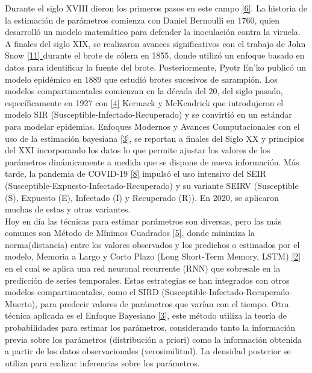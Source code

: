 Durante el siglo XVIII dieron los primeros pasos en este campo \hyperref[sec:6]{[6]}. La historia de la estimación de parámetros comienza con Daniel Bernoulli en 1760, quien desarrolló un modelo matemático para defender la inoculación contra la viruela. A finales del siglo XIX, se realizaron avances significativos con el trabajo de John Snow \hyperref[sec:11]{[11] } durante el brote de cólera en 1855, donde utilizó un enfoque basado en datos para identificar la fuente del brote. Posteriormente, Pyotr En'ko publicó un modelo epidémico en 1889 que estudió brotes sucesivos de sarampión. Los modelos compartimentales comienzan en la década del 20, del siglo pasado, específicamente en 1927 con \hyperref[sec:4]{[4]} Kermack y McKendrick que introdujeron el modelo SIR (Susceptible-Infectado-Recuperado) y se convirtió en un estándar para modelar epidemias. Enfoques Modernos y Avances Computacionales con el uso de la estimación bayesiana \hyperref[sec:3]{[3]}, se reportan a finales del Siglo XX y principios del XXI incorporando los datos lo que permite ajustar los valores de los parámetros dinámicamente a medida que se dispone de nueva información. Más tarde, la pandemia de COVID-19 \hyperref[sec:8]{[8]} impulsó el uso intensivo del SEIR (Susceptible-Expuesto-Infectado-Recuperado) y su variante SEIRV (Susceptible (S), Expuesto (E), Infectado (I) y Recuperado (R)). En 2020, se aplicaron muchas de estas y otras variantes. \\

Hoy en día las técnicas para estimar parámetros son diversas, pero las más comunes son Método de Mínimos Cuadrados \hyperref[sec:5]{ [5]}, donde minimiza la norma(distancia) entre los valores observados y los predichos o estimados por el modelo, Memoria a Largo y Corto Plazo (Long Short-Term Memory, LSTM) \hyperref[sec:2]{ [2]} en el cual se aplica una red neuronal recurrente (RNN) que sobresale en la predicción de series temporales. Estas estrategias se han integrados con otros modelos compartimentales, como el SIRD (Susceptible-Infectado-Recuperado-Muerto), para predecir valores de parámetros que varían con el tiempo. Otra técnica aplicada es el Enfoque Bayesiano \hyperref[sec:3]{[3]}, este método utiliza la teoría de probabilidades para estimar los parámetros, considerando tanto la información previa sobre los parámetros (distribución a priori) como la información obtenida a partir de los datos observacionales (verosimilitud). La densidad posterior se utiliza para realizar inferencias sobre los parámetros. \\

